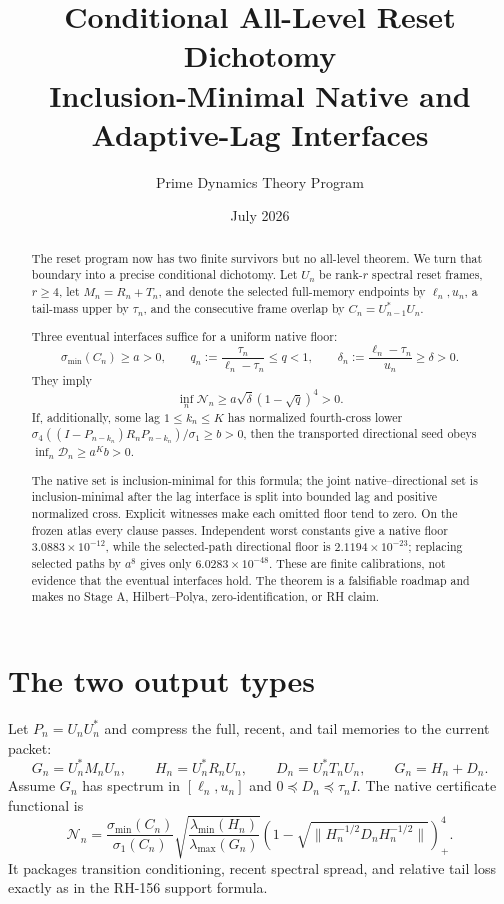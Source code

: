 \documentclass[12pt]{article}
\title{Conditional All-Level Reset Dichotomy\\\large Inclusion-Minimal Native and Adaptive-Lag Interfaces}
\author{Prime Dynamics Theory Program}
\date{July 2026}
\newcommand{\smin}{\sigma_{\min}}
\begin{document}
\maketitle

\begin{abstract}
The reset program now has two finite survivors but no all-level theorem.  We
turn that boundary into a precise conditional dichotomy.  Let $U_n$ be
rank-$r$ spectral reset frames, $r\geq4$, let $M_n=R_n+T_n$, and denote the
selected full-memory endpoints by $\ell_n,u_n$, a tail-mass upper by $\tau_n$,
and the consecutive frame overlap by $C_n=U_{n-1}^*U_n$.

Three eventual interfaces suffice for a uniform native floor:
\[
 \smin(C_n)\geq a>0,\qquad
 q_n:=\frac{\tau_n}{\ell_n-\tau_n}\leq q<1,
 \qquad
 \delta_n:=\frac{\ell_n-\tau_n}{u_n}\geq\delta>0.
\]
They imply
\[
 \inf_n\mathcal N_n\geq
 a\sqrt\delta(1-\sqrt q)^4>0.
\]
If, additionally, some lag $1\leq k_n\leq K$ has normalized fourth-cross
lower $\sigma_4((I-P_{n-k_n})R_nP_{n-k_n})/\sigma_1\geq b>0$, then the
transported directional seed obeys
$\inf_n\mathcal D_n\geq a^K b>0$.

The native set is inclusion-minimal for this formula; the joint
native--directional set is inclusion-minimal after the lag interface is
split into bounded lag and positive normalized cross.  Explicit witnesses
make each omitted floor tend to zero.  On the frozen atlas every clause
passes.  Independent worst constants give a native floor
$3.0883\times10^{-12}$, while the selected-path directional floor is
$2.1194\times10^{-23}$; replacing selected paths by $a^8$ gives only
$6.0283\times10^{-48}$.  These are finite calibrations, not evidence that the
eventual interfaces hold.  The theorem is a falsifiable roadmap and makes no
Stage A, Hilbert--Polya, zero-identification, or RH claim.
\end{abstract}

\section{The two output types}
Let $P_n=U_nU_n^*$ and compress the full, recent, and tail memories to the
current packet:
\[
 G_n=U_n^*M_nU_n,\qquad H_n=U_n^*R_nU_n,
 \qquad D_n=U_n^*T_nU_n,\qquad G_n=H_n+D_n.
\]
Assume $G_n$ has spectrum in $[\ell_n,u_n]$ and
$0\preceq D_n\preceq\tau_nI$.  The native certificate functional is
\[
 \mathcal N_n=
 \frac{\smin(C_n)}{\sigma_1(C_n)}
 \sqrt{\frac{\lambda_{\min}(H_n)}{\lambda_{\max}(G_n)}}
 \left(1-\sqrt{\|H_n^{-1/2}D_nH_n^{-1/2}\|}\right)_+^4.
\]
It packages transition conditioning, recent spectral spread, and relative
tail loss exactly as in the RH-156 support formula.
\end{document}

